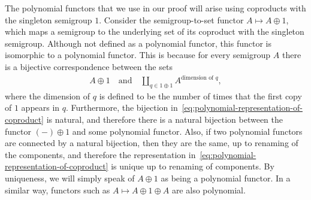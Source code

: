     The polynomial functors that we  use in our proof will arise using coproducts with the singleton semigroup $1$. Consider  the semigroup-to-set functor $A \mapsto A \oplus 1$, which maps a semigroup to the underlying set of its coproduct with the singleton semigroup. Although not defined as a polynomial functor, this functor is isomorphic to a polynomial functor. This is because for every semigroup $A$ there is a bijective correspondence between the sets
    \begin{align}\label{eq:polynomial-representation-of-coproduct}
    A \oplus 1 \quad \text{and} \quad \coprod_{q \in 1 \oplus 1} A^{\text{dimension of $q$}},
    \end{align}
    where the dimension of $q$ is defined to be the number of times that the first copy of $1$ appears in $q$. Furthermore, the bijection in~\eqref{eq:polynomial-representation-of-coproduct} is natural, and therefore there is a natural bijection between the functor $(-) \oplus 1$ and some polynomial functor. Also, if two polynomial functors are connected by a natural bijection, then they are the same, up to renaming of the components, and therefore the representation in~\eqref{eq:polynomial-representation-of-coproduct} is unique up to renaming of components. By uniqueness, we will simply speak of $A \oplus 1$ as being a polynomial functor.  In a similar way, functors such as $A \mapsto A \oplus 1 \oplus A$ are also polynomial.









